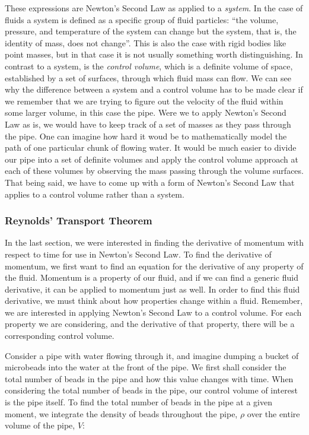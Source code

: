 \documentclass[twocolumn,12pth]{article}
\begin{document}
These expressions are Newton's Second Law as applied to a \textit{system}.
In the case of fluids a system is defined as a specific group of fluid particles: ``the volume, pressure, and temperature of the system can change but the system, that is, the identity of mass, does not change''. \cite{Granger1995}
This is also the case with rigid bodies like point masses, but in that case it is not usually something worth distinguishing.
In contrast to a system, is the \textit{control volume}, which is a definite volume of space, established by a set of surfaces, through which fluid mass can flow.
We can see why the difference between a system and a control volume has to be made clear if we remember that we are trying to figure out the velocity of the fluid within some larger volume, in this case the pipe.
Were we to apply Newton's Second Law as is, we would have to keep track of a set of masses as they pass through the pipe.
One can imagine how hard it woud be to mathematically model the path of one particular chunk of flowing water.
It would be much easier to divide our pipe into a set of definite volumes and apply the control volume approach at each of these volumes by observing the mass passing through the volume surfaces.
That being said, we have to come up with a form of Newton's Second Law that applies to a control volume rather than a system.

\subsubsection{Reynolds' Transport Theorem}

In the last section, we were interested in finding the derivative of momentum with respect to time for use in Newton's Second Law.
To find the derivative of momentum, we first want to find an equation for the derivative of any property of the fluid.
Momentum is a property of our fluid, and if we can find a generic fluid derivative, it can be applied to momentum just as well.
In order to find this fluid derivative, we must think about how properties change within a fluid.
Remember, we are interested in applying Newton's Second Law to a control volume.
For each property we are considering, and the derivative of that property, there will be a corresponding control volume.

Consider a pipe with water flowing through it, and imagine dumping a bucket of microbeads into the water at the front of the pipe.
We first shall consider the total number of beads in the pipe and how this value changes with time.
When considering the total number of beads in the pipe, our control volume of interest is the pipe itself.
To find the total number of beads in the pipe at a given moment, we integrate the density of beads throughout the pipe, $\rho$ over the entire volume of the pipe, $V$:
\end{document}
